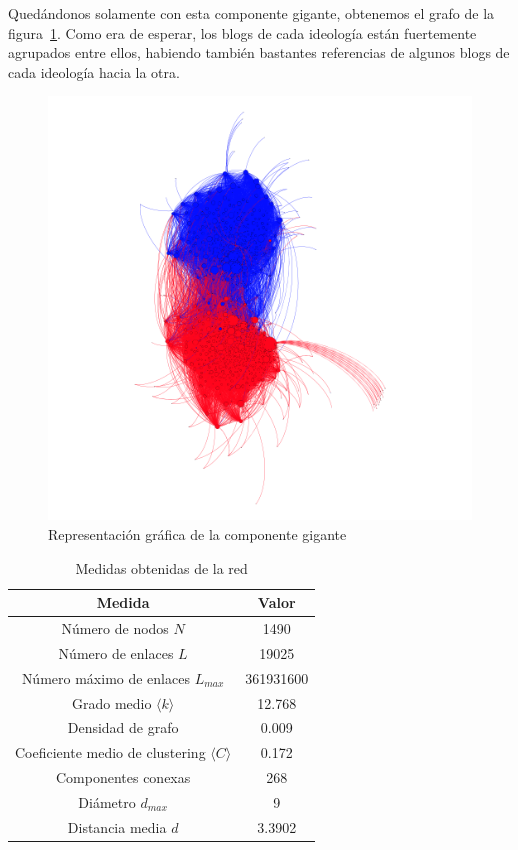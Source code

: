Quedándonos solamente con esta componente gigante, obtenemos el grafo de la
figura~\ref{fig:network-giant-component}. Como era de esperar, los blogs de cada
ideología están fuertemente agrupados entre ellos, habiendo también bastantes
referencias de algunos blogs de cada ideología hacia la otra.

\begin{figure}
    \includegraphics[width=\textwidth]{images/visualization/network/giant-component.png}
    \caption{Representación gráfica de la componente gigante}
    \label{fig:network-giant-component}
\end{figure}

\begin{table}[h!]
    \caption{Medidas obtenidas de la red}
    \label{tab:measurements}
    \begin{center}
    \begin{tabular}{ |c|c| }
        \hline
        Medida & Valor \\
        \hline
        Número de nodos $N$ & 1490 \\
        \hline
        Número de enlaces $L$ & 19025 \\
        \hline
        Número máximo de enlaces $L_{max}$ & 361931600 \\
        \hline
        Grado medio $\langle k \rangle$ & 12.768 \\
        \hline
        Densidad de grafo & 0.009 \\
        \hline
        Coeficiente medio de clustering $\langle C \rangle$ & 0.172 \\
        \hline
        Componentes conexas & 268 \\
        \hline
        Diámetro $d_{max}$ & 9 \\
        \hline
        Distancia media $d$ & 3.3902 \\
        \hline
    \end{tabular}
    \end{center}
\end{table}

